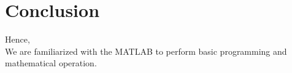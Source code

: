 \documentclass[12pt]{article}
\begin{document}
\pagebreak

\section{Conclusion}
Hence, \\
We are familiarized with the MATLAB to perform basic programming and mathematical operation.
\newpage
\end{document}
